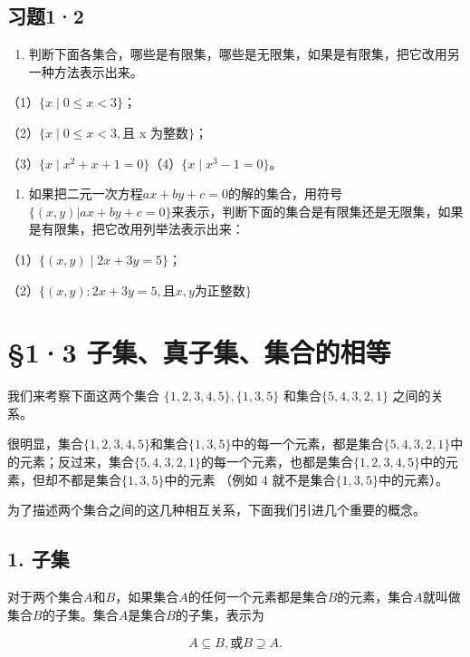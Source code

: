 \subsection{习题1·2}

\begin{enumerate}
\item
  判断下面各集合，哪些是有限集，哪些是无限集，如果是有限集，把它改用另一种方法表示出来。
\end{enumerate}

（1）\(\{x\mid0\leqslant x<3\}\)；

（2）\(\{x\mid0\leqslant x<3,\)且 x 为整数\(\}\)；

（3）\(\{x\mid x^2 +x + 1 = 0\}\)（4）\(\{x\mid x^3 -1 = 0\}\)。

\begin{enumerate}[start=2]
\item
  如果把二元一次方程\(ax + by + c = 0\)的解的集合，用符号\(\{(x, y) | ax + by + c = 0\}\)来表示，判断下面的集合是有限集还是无限集，如果是有限集，把它改用列举法表示出来：
\end{enumerate}

（1）\(\{(x,y)\mid2x+3y=5\}\)；

（2）\(\{(x,y):2x+3y=5,\text{且}x,y\text{为正整数}\}\)

\section{§1·3 子集、真子集、集合的相等}

我们来考察下面这两个集合 \(\{1, 2, 3, 4, 5\}, \{1, 3, 5\}\)
和集合\(\{5,4,3,2,1\}\) 之间的关系。

很明显，集合\(\{1, 2, 3, 4, 5\}\)和集合\(\{1, 3, 5\}\)中的每一个元素，都是集合\(\{5, 4, 3, 2, 1\}\)中的元素；反过来，集合\(\{5, 4, 3, 2, 1\}\)的每一个元素，也都是集合\(\{1, 2, 3, 4, 5\}\)中的元素，但却不都是集合\(\{1, 3, 5\}\)中的元素
（例如 4 就不是集合\(\{1, 3, 5\}\)中的元素）。

为了描述两个集合之间的这几种相互关系，下面我们引进几个重要的概念。

\subsection{1. 子集}

对于两个集合\(A\)和\(B\)，如果集合\(A\)的任何一个元素都是集合\(B\)的元素，集合\(A\)就叫做集合\(B\)的子集。集合\(A\)是集合\(B\)的子集，表示为

\[
A \subseteq B, \text{或} B \supseteq A.
\]

